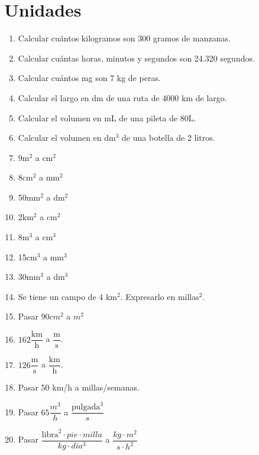 \section{Unidades}

\begin{enumerate}
\item Calcular cuántos kilogramos son  300 gramos de manzanas.

\item Calcular cuántas horas, minutos y segundos son 24.320 segundos.

\item Calcular cuántos mg son 7 kg de peras.

\item Calcular el largo en dm de una ruta de 4000 km de largo.

\item Calcular el volumen en mL de una pileta de 80L.

\item Calcular el volumen en dm$^3$ de una botella de 2 litros.

\item 9m$^2$ a cm$^2$

\item 8cm$^2$ a mm$^2$

\item 50mm$^2$ a dm$^2$

\item 2km$^2$ a cm$^2$

\item 8m$^3$ a cm$^3$

\item 15cm$^3$ a mm$^3$

\item 30mm$^3$ a dm$^3$

\item Se tiene un campo de 4 km$^2$. Expresarlo en millas$^2$.

\item Pasar $90 cm^2$ a $m^2$

\item $162 \dfrac{\text{km}}{\text{h}}$ a $\dfrac{\text{m}}{\text{s}}$.

\item $126 \dfrac{\text{m}}{\text{s}}$ a $\dfrac{\text{km}}{\text{h}}$.

\item Pasar  $50$ km/h a millas/semanas.

\item Pasar $65 \dfrac{m^3}{h}$ a $\dfrac{\text{pulgada}^3}{s}$


\item Pasar 
$\dfrac{\text{libra}^2 \cdot pie \cdot milla}{kg \cdot dia^3}$
a
$\dfrac{kg \cdot m^2}{s\cdot h^2}$

\end{enumerate}
